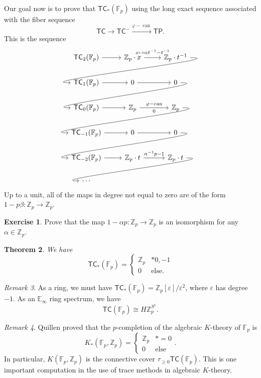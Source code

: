 \documentclass[10pt, oneside]{memoir}
\newtheorem{thm}{Theorem}[subsection]
\theoremstyle{definition}
\newtheorem{exer}[thm]{Exercise}
\theoremstyle{remark}
\newtheorem{rmk}[thm]{Remark}
\theoremstyle{plain}
\theoremstyle{definition}
\theoremstyle{remark}
\newcommand{\Z}{\mathbb{Z}}
\newcommand{\E}{\mathbb{E}}
\newcommand{\F}{\mathbb{F}}
\newcommand{\ep}{\varepsilon}
\newcommand{\on}[1]{\operatorname{#1}}
\newcommand{\ms}[1]{\mathsf{#1}}
\newcommand{\1}{\mathbf{1}}
\newcommand{\2}{\mathbf{2}}
\newcommand{\3}{\mathbf{3}}
\newcommand{\TC}{\ms{TC}}
\newcommand{\TP}{\ms{TP}}
\begin{document}
Our goal now is to prove that $\TC_*(\F_p)$ using the long exact sequence associated with the fiber sequence
\[ \TC \to \TC^- \xrightarrow{\varphi - \on{can}} \TP. \]
This is the sequence
\begin{equation*}
\begin{tikzcd}
    \TC_2(\F_p) \ar{r} & \Z_p \cdot x \arrow[r, "x \mapsto \alpha t^{-1} - t^{-1}" {yshift=2pt}] & \Z_p \cdot t^{-1} \arrow[out=0,in=180, looseness=1]{dll} \\
    \TC_1(\F_p) \ar{r} & 0 \ar{r} & 0 \arrow[out=0,in=180, looseness=1]{dll} \\
    \TC_0(\F_p) \ar{r} & \Z_p \ar{r}{\varphi-\on{can}}[swap]{0} & \Z_p \arrow[out=0, in=180, looseness=1]{dll} \\
    \TC_{-1}(\F_p) \ar{r} & 0 \ar{r} & 0 \arrow[out=0,in=180, looseness=1]{dll} \\
    \TC_{-2}(\F_p) \ar{r} & \Z_p \cdot t \ar{r}{\alpha^{-1}p-1} & \Z_p \cdot t \arrow[out=0,in=180, looseness=1]{dll} \\
    \cdots
\end{tikzcd}
\end{equation*}
Up to a unit, all of the maps in degree not equal to zero are of the form $1-p \beta \colon \Z_p \to \Z_p$.

\begin{exer}
    Prove that the map $1-\alpha p \colon \Z_p \to \Z_p$ is an isomorphism for any $\alpha \in \Z_p$.
\end{exer}

\begin{thm}
    We have
    \[ \TC_*(\F_p) = \begin{cases}
        \Z_p & * 0, -1 \\
        0 & \text{else}.
    \end{cases} \]
\end{thm}

\begin{rmk}
    As a ring, we must have $\TC_*(\F_p) = \Z_p[\ep]/\ep^2$, where $\ep$ has degree $-1$. As an $\E_{\infty}$ ring spectrum, we have
    \[ \TC(\F_p) \cong H\Z_p^{S^1}. \]
\end{rmk}

\begin{rmk}
    Quillen proved that the $p$-completion of the algebraic $K$-theory of $\F_p$ is
    \[ K_*(\F_p, \Z_p) = \begin{cases}
        \Z_p & *=0 \\
        0 & \text{else}
    \end{cases}. \]
    In particular, $K(\F_p, \Z_p)$ is the connective cover $\tau_{\geq 0} \TC(\F_p)$. This is one important computation in the use of trace methods in algebraic $K$-theory.
\end{rmk}
\end{document}
